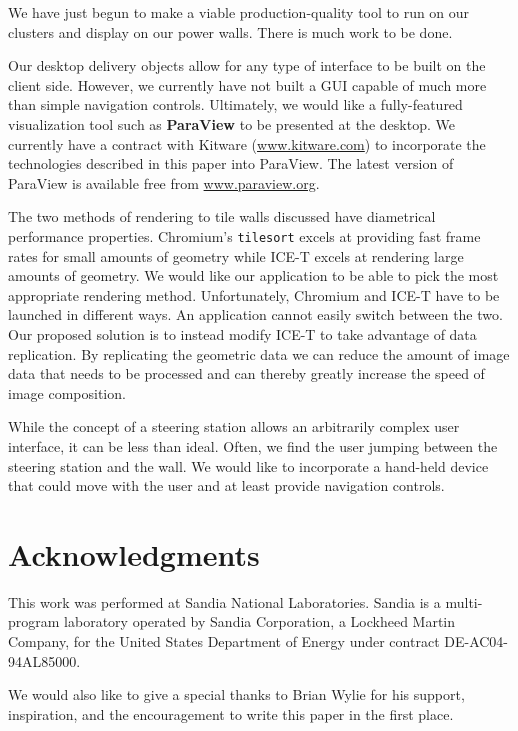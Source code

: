 \documentclass{acmsiggraph}
\newcommand{\cidentifier}[1]{\texttt{#1}}
\newcommand{\keyterm}[1]{\textbf{#1}}
\begin{document}
  We have just begun to make a viable production-quality tool to run on our
  clusters and display on our power walls.  There is much work to be done.

  Our desktop delivery objects allow for any type of interface to be built
  on the client side.  However, we currently have not built a GUI capable
  of much more than simple navigation controls.  Ultimately, we would like
  a fully-featured visualization tool such as \keyterm{ParaView}
  \cite{Law01} to be presented at the desktop.  We currently have a
  contract with Kitware (\href{http://www.kitware.com}{www.kitware.com}) to
  incorporate the technologies described in this paper into ParaView.  The
  latest version of ParaView is available free from
  \href{http://www.paraview.org}{www.paraview.org}.

  The two methods of rendering to tile walls discussed have diametrical
  performance properties.  Chromium's \cidentifier{tile\-sort} excels at
  providing fast frame rates for small amounts of geometry while ICE-T
  excels at rendering large amounts of geometry.  We would like our
  application to be able to pick the most appropriate rendering method.
  Unfortunately, Chromium and ICE-T have to be launched in different ways.
  An application cannot easily switch between the two.  Our proposed
  solution is to instead modify ICE-T to take advantage of data
  replication.  By replicating the geometric data we can reduce the amount
  of image data that needs to be processed and can thereby greatly increase
  the speed of image composition.

  While the concept of a steering station allows an arbitrarily complex
  user interface, it can be less than ideal.  Often, we find the user
  jumping between the steering station and the wall.  We would like to
  incorporate a hand-held device that could move with the user and at least
  provide navigation controls.


  \section{Acknowledgments}

  This work was performed at Sandia National Laboratories.  Sandia is a
  multi-program laboratory operated by Sandia Corporation, a Lockheed
  Martin Company, for the United States Department of Energy under contract
  DE-AC04-94AL85000.

  We would also like to give a special thanks to Brian Wylie for his
  support, inspiration, and the encouragement to write this paper in the
  first place.
\end{document}
